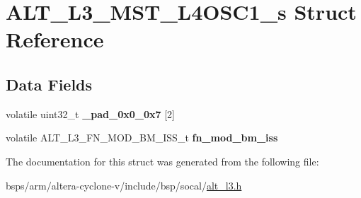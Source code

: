 \hypertarget{structALT__L3__MST__L4OSC1__s}{}\section{A\+L\+T\+\_\+\+L3\+\_\+\+M\+S\+T\+\_\+\+L4\+O\+S\+C1\+\_\+s Struct Reference}
\label{structALT__L3__MST__L4OSC1__s}
\subsection*{Data Fields}
\begin{DoxyCompactItemize}
\item 
\mbox{\label{structALT__L3__MST__L4OSC1__s_a4dc414173e013470e67ea72bc9750553}} 
volatile uint32\+\_\+t {\bfseries \+\_\+pad\+\_\+0x0\+\_\+0x7} \mbox{[}2\mbox{]}
\item 
\mbox{\label{structALT__L3__MST__L4OSC1__s_a1d70dcdd486f17c24f0a80586d57a403}} 
volatile A\+L\+T\+\_\+\+L3\+\_\+\+F\+N\+\_\+\+M\+O\+D\+\_\+\+B\+M\+\_\+\+I\+S\+S\+\_\+t {\bfseries fn\+\_\+mod\+\_\+bm\+\_\+iss}
\end{DoxyCompactItemize}


The documentation for this struct was generated from the following file\+:\begin{DoxyCompactItemize}
\item 
bsps/arm/altera-\/cyclone-\/v/include/bsp/socal/\mbox{\hyperlink{alt__l3_8h}{alt\+\_\+l3.\+h}}\end{DoxyCompactItemize}
